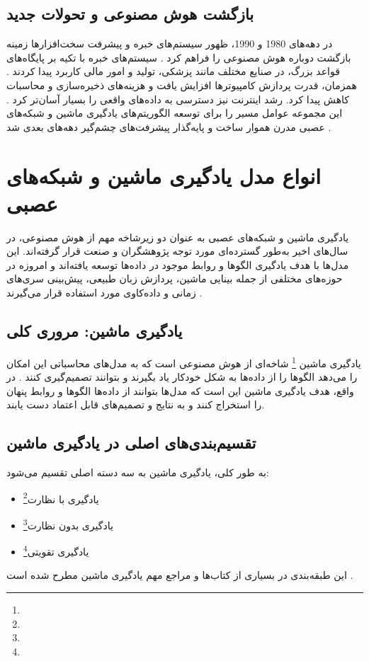 \subsection{بازگشت هوش مصنوعی و تحولات جدید}
در دهه‌های 1980 و 1990، ظهور سیستم‌های خبره و پیشرفت سخت‌افزارها زمینه بازگشت دوباره هوش مصنوعی را فراهم کرد \cite{feigenbaum1983handbook}. سیستم‌های خبره با تکیه بر پایگاه‌های قواعد بزرگ، در صنایع مختلف مانند پزشکی، تولید و امور مالی کاربرد پیدا کردند \cite{mccorduck2004machines}. همزمان، قدرت پردازش کامپیوترها افزایش یافت و هزینه‌های ذخیره‌سازی و محاسبات کاهش پیدا کرد. رشد اینترنت نیز دسترسی به داده‌های واقعی را بسیار آسان‌تر کرد \cite{nilsson2010quest}. این مجموعه عوامل مسیر را برای توسعه الگوریتم‌های یادگیری ماشین و شبکه‌های عصبی مدرن هموار ساخت و پایه‌گذار پیشرفت‌های چشم‌گیر دهه‌های بعدی شد \cite{russell2016artificial}.


\section{انواع مدل یادگیری ماشین و شبکه‌های عصبی}\label{sec:ml-types}
یادگیری ماشین و شبکه‌های عصبی به عنوان دو زیرشاخه مهم از هوش مصنوعی، در سال‌های اخیر به‌طور گسترده‌ای مورد توجه پژوهشگران و صنعت قرار گرفته‌اند. این مدل‌ها با هدف یادگیری الگوها و روابط موجود در داده‌ها توسعه یافته‌اند و امروزه در حوزه‌های مختلفی از جمله بینایی ماشین، پردازش زبان طبیعی، پیش‌بینی سری‌های زمانی و داده‌کاوی مورد استفاده قرار می‌گیرند \cite{bishop2006pattern,mitchell1997machine,murphy2012machine}.

\subsection{یادگیری ماشین: مروری کلی}
یادگیری ماشین \footnote{} شاخه‌ای از هوش مصنوعی است که به مدل‌های محاسباتی این امکان را می‌دهد الگوها را از داده‌ها به شکل خودکار یاد بگیرند و بتوانند تصمیم‌گیری کنند
\cite{goodfellow2016deep,mitchell1997machine}.
در واقع، هدف یادگیری ماشین این است که مدل‌ها بتوانند از داده‌ها الگوها و روابط پنهان را استخراج کنند و به نتایج و تصمیم‌های قابل اعتماد دست یابند.

\subsection{تقسیم‌بندی‌های اصلی در یادگیری ماشین}
به طور کلی، یادگیری ماشین به سه دسته اصلی تقسیم می‌شود:
\begin{itemize}
	\item یادگیری با نظارت\footnote{}
	\item یادگیری بدون نظارت\footnote{}
	\item یادگیری تقویتی\footnote{}	
\end{itemize}
این طبقه‌بندی در بسیاری از کتاب‌ها و مراجع مهم یادگیری ماشین مطرح شده است
\cite{bishop2006pattern,murphy2012machine}.

